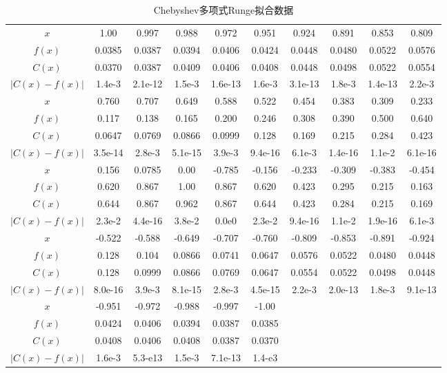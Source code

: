 \documentclass[UTF8]{ctexart}
\begin{document}
\begin{table}[H]
    \caption{Chebyshev多项式Runge拟合数据}
    \begin{tabular}{|c|ccccccccc|}
        \hline
        $x$ & 1.00 & 0.997 & 0.988 & 0.972 & 0.951 & 0.924 & 0.891 & 0.853 & 0.809 \\
        $f(x)$ & 0.0385 & 0.0387 & 0.0394 & 0.0406 & 0.0424 & 0.0448 & 0.0480 & 0.0522 & 0.0576 \\
        $C(x)$ & 0.0370 & 0.0387 & 0.0409 & 0.0406 & 0.0408 & 0.0448 & 0.0498 & 0.0522 & 0.0554 \\
        $|C(x)-f(x)|$ & 1.4e-3 & 2.1e-12 & 1.5e-3 & 1.6e-13 & 1.6e-3 & 3.1e-13 & 1.8e-3 & 1.4e-13 & 2.2e-3 \\
        \hline
        $x$ & 0.760 & 0.707 & 0.649 & 0.588 & 0.522 & 0.454 & 0.383 & 0.309 & 0.233 \\
        $f(x)$ & 0.117 & 0.138 & 0.165 & 0.200 & 0.246 & 0.308 & 0.390 & 0.500 & 0.640 \\
        $C(x)$ & 0.0647 & 0.0769 & 0.0866 & 0.0999 & 0.128 & 0.169 & 0.215 & 0.284 & 0.423 \\
        $|C(x)-f(x)|$ & 3.5e-14 & 2.8e-3 & 5.1e-15 & 3.9e-3 & 9.4e-16 & 6.1e-3 & 1.4e-16 & 1.1e-2 & 6.1e-16 \\
        \hline
        $x$ & 0.156 & 0.0785 & 0.00 & -0.785 & -0.156 & -0.233 & -0.309 & -0.383 & -0.454 \\
        $f(x)$ & 0.620 & 0.867 & 1.00 & 0.867 & 0.620 & 0.423 & 0.295 & 0.215 & 0.163\\
        $C(x)$ & 0.644 & 0.867 & 0.962 & 0.867 & 0.644 & 0.423 & 0.284 & 0.215 & 0.169 \\
        $|C(x)-f(x)|$ & 2.3e-2 & 4.4e-16 & 3.8e-2 & 0.0e0 & 2.3e-2 & 9.4e-16 & 1.1e-2 & 1.9e-16 & 6.1e-3 \\
        \hline
        $x$ & -0.522 & -0.588 & -0.649 & -0.707 & -0.760 & -0.809 & -0.853 & -0.891 & -0.924 \\
        $f(x)$ & 0.128 & 0.104 & 0.0866 & 0.0741 & 0.0647 & 0.0576 & 0.0522 & 0.0480 & 0.0448\\
        $C(x)$ & 0.128 & 0.0999 & 0.0866 & 0.0769 & 0.0647 & 0.0554 & 0.0522 & 0.0498 & 0.0448\\
        $|C(x)-f(x)|$ & 8.0e-16 & 3.9e-3 & 8.1e-15 & 2.8e-3 & 4.5e-15 & 2.2e-3 & 2.0e-13 & 1.8e-3 & 9.1e-13 \\
        \hline
        $x$ & -0.951 & -0.972 & -0.988 & -0.997 & -1.00 & ~ & ~ & ~ & ~ \\
        $f(x)$ & 0.0424 & 0.0406 & 0.0394 & 0.0387 & 0.0385 & ~ & ~ & ~ & ~\\
        $C(x)$ & 0.0408 & 0.0406 & 0.0408 & 0.0387 & 0.0370 & ~ & ~ & ~ & ~\\
        $|C(x)-f(x)|$ & 1.6e-3 & 5.3-e13 & 1.5e-3 & 7.1e-13 & 1.4-e3 & ~ & ~ & ~ & ~ \\
        \hline
    \end{tabular}
\end{table}
\end{document}
